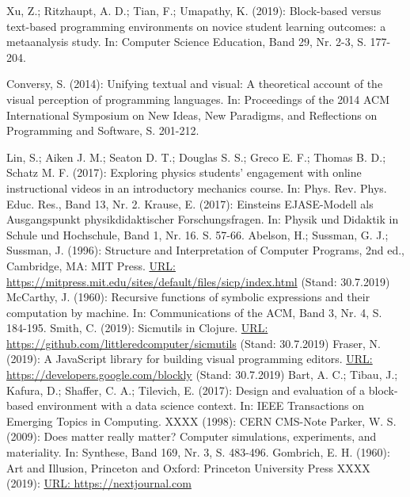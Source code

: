 \documentclass[twocolumn, 10pt]{article}
\begin{document}
\begin{thebibliography}{999}
Xu, Z.; Ritzhaupt, A. D.; Tian, F.; Umapathy, K. (2019): Block-based versus text-based programming environments on novice student learning outcomes: a metaanalysis study. In: Computer Science Education, Band 29, Nr. 2-3, S. 177-204.

Conversy, S. (2014): Unifying textual and visual: A theoretical account of the visual perception of programming languages. In: Proceedings of the 2014 ACM International Symposium on New Ideas, New Paradigms, and Reflections on Programming and Software, S. 201-212.

Lin, S.; Aiken J. M.; Seaton D. T.; Douglas S. S.; Greco E. F.; Thomas B. D.; Schatz M. F. (2017): Exploring physics students’ engagement with online instructional videos in an introductory mechanics course. In: Phys. Rev. Phys. Educ. Res., Band 13, Nr. 2.
Krause, E. (2017): Einsteins EJASE-Modell als Ausgangspunkt physikdidaktischer Forschungsfragen. In: Physik und Didaktik in Schule und Hochschule, Band 1, Nr. 16. S. 57-66.
Abelson, H.; Sussman, G. J.; Sussman, J. (1996): Structure and Interpretation of Computer Programs, 2nd ed., Cambridge, MA: MIT Press. \url{URL: https://mitpress.mit.edu/sites/default/files/sicp/index.html} (Stand: 30.7.2019)
McCarthy, J. (1960): Recursive functions of symbolic expressions and their computation by machine. In: Communications of the ACM, Band 3, Nr. 4, S. 184-195.
Smith, C. (2019): Sicmutils in Clojure. \url{URL: https://github.com/littleredcomputer/sicmutils} (Stand: 30.7.2019)
Fraser, N. (2019): A JavaScript library for building visual programming editors. \url{URL: https://developers.google.com/blockly} (Stand: 30.7.2019)
Bart, A. C.; Tibau, J.; Kafura, D.; Shaffer, C. A.; Tilevich, E. (2017): Design and evaluation of a block-based environment with a data science context. In: IEEE Transactions on Emerging Topics in Computing.
XXXX (1998): CERN CMS-Note
Parker, W. S. (2009): Does matter really matter? Computer simulations, experiments, and materiality. In: Synthese, Band 169, Nr. 3, S. 483-496.
Gombrich, E. H. (1960): Art and Illusion, Princeton and Oxford: Princeton University Press
XXXX (2019): \url{URL: https://nextjournal.com}
\end{thebibliography}
\end{document}
